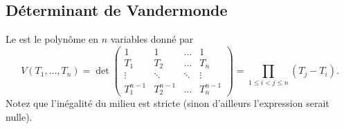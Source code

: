 \subsection{Déterminant de Vandermonde}

\begin{proposition}  \label{PropnuUvtj}
	Le  est le polynôme en \( n\) variables donné par
	\begin{equation}
		V(T_1,\ldots, T_n)=\det\begin{pmatrix}
			1         & 1         & \ldots & 1         \\
			T_1       & T_2       & \ldots & T_n       \\
			\vdots    & \ddots    & \ddots & \vdots    \\
			T_1^{n-1} & T_2^{n-1} & \ldots & T_n^{n-1}
		\end{pmatrix}=\prod_{1\leq i<j\leq n}(T_j-T_i).
	\end{equation}
	Notez que l'inégalité du milieu est stricte (sinon d'ailleurs l'expression serait nulle).
\end{proposition}

